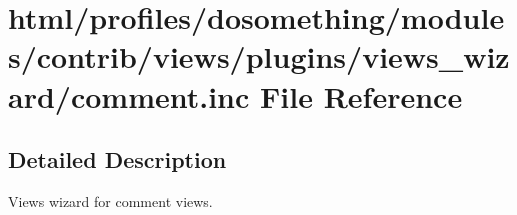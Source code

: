 \hypertarget{comment_8inc}{
\section{html/profiles/dosomething/modules/contrib/views/plugins/views\_\-wizard/comment.inc File Reference}
\label{comment_8inc}
}


\subsection{Detailed Description}
Views wizard for comment views. 